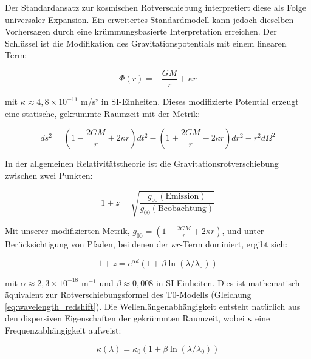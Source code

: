 \documentclass[twocolumn,aps,prl]{revtex4-2}
\begin{document}
	Der Standardansatz zur kosmischen Rotverschiebung interpretiert diese als Folge universaler Expansion. Ein erweitertes Standardmodell kann jedoch dieselben Vorhersagen durch eine krümmungsbasierte Interpretation erreichen. Der Schlüssel ist die Modifikation des Gravitationspotentials mit einem linearen Term:
	
	\begin{equation}
		\Phi(r) = -\frac{GM}{r} + \kappa r
		\label{eq:modified_potential_sm}
	\end{equation}
	
	mit \(\kappa \approx 4,8 \times 10^{-11}\) m/s² in SI-Einheiten. Dieses modifizierte Potential erzeugt eine statische, gekrümmte Raumzeit mit der Metrik:
	
	\begin{equation}
		ds^2 = (1 - \frac{2GM}{r} + 2\kappa r)dt^2 - (1 + \frac{2GM}{r} - 2\kappa r)dr^2 - r^2d\Omega^2
		\label{eq:modified_metric}
	\end{equation}
	
	In der allgemeinen Relativitätstheorie ist die Gravitationsrotverschiebung zwischen zwei Punkten:
	
	\begin{equation}
		1 + z = \sqrt{\frac{g_{00}(\text{Emission})}{g_{00}(\text{Beobachtung})}}
		\label{eq:gravitational_redshift}
	\end{equation}
	
	Mit unserer modifizierten Metrik, \(g_{00} = (1 - \frac{2GM}{r} + 2\kappa r)\), und unter Berücksichtigung von Pfaden, bei denen der \(\kappa r\)-Term dominiert, ergibt sich:
	
	\begin{equation}
		1 + z = e^{\alpha d}(1 + \beta \ln(\lambda/\lambda_0))
		\label{eq:extended_sm_redshift}
	\end{equation}
	
	mit \(\alpha \approx 2,3 \times 10^{-18}\) m\(^{-1}\) und \(\beta \approx 0,008\) in SI-Einheiten. Dies ist mathematisch äquivalent zur Rotverschiebungsformel des T0-Modells (Gleichung \ref{eq:wavelength_redshift}). Die Wellenlängenabhängigkeit entsteht natürlich aus den dispersiven Eigenschaften der gekrümmten Raumzeit, wobei \(\kappa\) eine Frequenzabhängigkeit aufweist:
	
	\begin{equation}
		\kappa(\lambda) = \kappa_0(1 + \beta \ln(\lambda/\lambda_0))
		\label{eq:kappa_wavelength}
	\end{equation}
	
\end{document}
